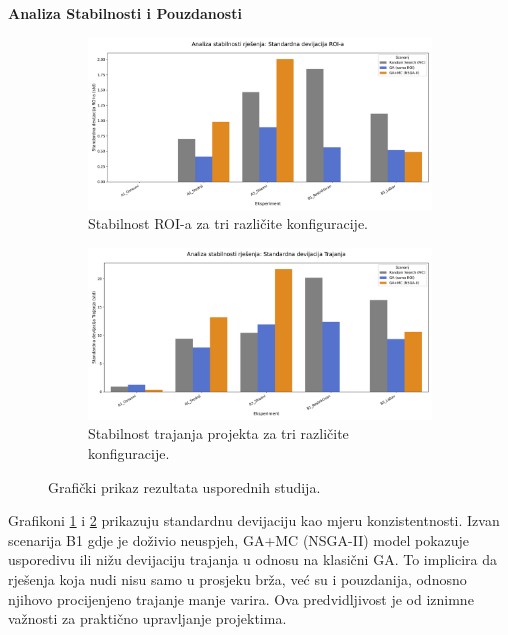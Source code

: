 \textbf{Analiza Stabilnosti i Pouzdanosti}
\begin{figure}[H]
    \centering
    \begin{subfigure}[b]{0.48\textwidth}
        \centering
        \includegraphics[width=\textwidth]{slike/grafikoni_final/C_stabilnost_roi.png}
        \caption{Stabilnost ROI-a za tri različite konfiguracije.}
        \label{fig:stab_roi}
    \end{subfigure}
    \hfill
    \begin{subfigure}[b]{0.48\textwidth}
        \centering
        \includegraphics[width=\textwidth]{slike/grafikoni_final/C_stabilnost_trajanje.png}
        \caption{Stabilnost trajanja projekta za tri različite konfiguracije.}
        \label{fig:stab_trajanje}
    \end{subfigure}
    \caption{Grafički prikaz rezultata usporednih  studija.}
    \label{fig:a_skalabilnost}
\end{figure}

Grafikoni \ref{fig:stab_roi} i \ref{fig:stab_trajanje} prikazuju standardnu devijaciju kao mjeru konzistentnosti. Izvan scenarija B1 gdje je doživio neuspjeh, GA+MC (NSGA-II) model pokazuje usporedivu ili nižu devijaciju trajanja u odnosu na klasični GA. To implicira da rješenja koja nudi nisu samo u prosjeku brža, već su i pouzdanija, odnosno njihovo procijenjeno trajanje manje varira. Ova predvidljivost je od iznimne važnosti za praktično upravljanje projektima.

